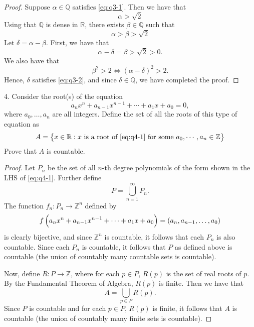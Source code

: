 \documentclass{article}
\newcommand{\Z}{\mathbb{Z}}
\newcommand{\Q}{\mathbb{Q}}
\newcommand{\R}{\mathbb{R}}
\begin{document}
\begin{proof}

Suppose $\alpha \in \Q$ satisfies \eqref{eq:q3-1}. Then we have that
%
\begin{equation*}
    \alpha > \sqrt 2
\end{equation*}
%
Using that $\Q$ is dense in $\R$, there exists $\beta \in \Q$ such that
%
\begin{equation*}
    \alpha > \beta > \sqrt 2
\end{equation*}
%
Let $\delta = \alpha - \beta$. First, we have that
%
\begin{equation*}
    \alpha - \delta = \beta > \sqrt 2 > 0
    .
\end{equation*}
%
We also have that
%
\begin{equation*}
    \beta^2 > 2
    \iff (\alpha - \delta)^2 > 2
    .
\end{equation*}
%
Hence, $\delta$ satisfies \eqref{eq:q3-2}, and since $\delta \in \Q$, we
have completed the proof.

\end{proof}

\newpage

4. Consider the root(s) of the equation
%
\begin{equation}
    a_n x^n + a_{n-1} x^{n-1} + \cdots + a_1 x + a_0 = 0
    ,
    \label{eq:q4-1}
\end{equation}
%
where $a_0, \ldots, a_n$ are all integers. Define the set of all the
roots of this type of equation as
%
\begin{equation*}
    A = \cbr{x \in \R : \text{$x$ is a root of \eqref{eq:q4-1} for some $a_0, \cdots, a_n \in \Z$}}
\end{equation*}
%
Prove that $A$ is countable.

\begin{proof}

Let $P_n$ be the set of all $n$-th degree polynomials of the form shown
in the LHS of \eqref{eq:q4-1}. Further define
%
\begin{equation*}
    P = \bigcup_{n = 1}^{\infty} P_n
    .
\end{equation*}
%
The function $f_n: P_n \to \Z^n$ defined by
%
\begin{equation*}
    f\del{a_n x^n + a_{n-1} x^{n-1} + \cdots + a_1 x + a_0} = \del{a_n, a_{n-1}, \ldots, a_0}
\end{equation*}
%
is clearly bijective, and since $\Z^n$ is countable, it follows that
each $P_n$ is also countable. Since each $P_n$ is countable, it follows
that $P$ as defined above is countable (the union of countably many
countable sets is countable).

Now, define $R: P \to \Z$, where for each $p \in P$, $R(p)$ is the set
of real roots of $p$. By the Fundamental Theorem of Algebra, $R(p)$ is
finite. Then we have that
%
\begin{equation*}
    A = \bigcup_{p \in P} R(p)
    .
\end{equation*}
%
Since $P$ is countable and for each $p \in P$, $R(p)$ is finite, it
follows that $A$ is countable (the union of countably many finite sets
is countable).

\end{proof}
\end{document}
